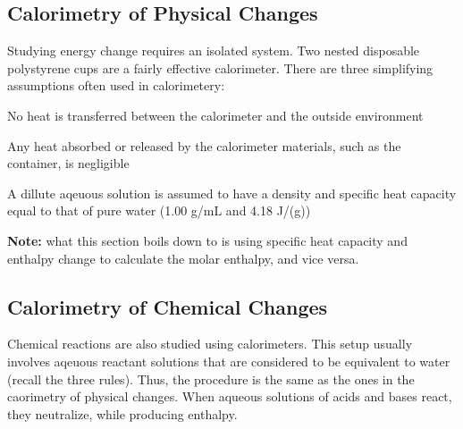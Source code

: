 \subsection{Calorimetry of Physical Changes}
Studying energy change requires an isolated system. Two nested disposable polystyrene cups are
a fairly effective calorimeter. There are three simplifying assumptions often used in calorimetery:
\begin{enum}
    \item No heat is transferred between the calorimeter and the outside environment
    \item Any heat absorbed or released by the calorimeter materials, such as the container, is
        negligible
    \item A dillute aqeuous solution is assumed to have a density and specific heat capacity equal
        to that of pure water (1.00 g/mL and 4.18 J/(g\celsius))
\end{enum}
\textbf{Note:} what this section boils down to is using specific heat capacity and enthalpy change
to calculate the molar enthalpy, and vice versa.

\subsection{Calorimetry of Chemical Changes}
Chemical reactions are also studied using calorimeters. This setup usually involves aqeuous 
reactant solutions that are considered to be equivalent to water (recall the three rules). Thus,
the procedure is the same as the ones in the caorimetry of physical changes. When aqueous 
solutions of acids and bases react, they neutralize, while producing enthalpy.
